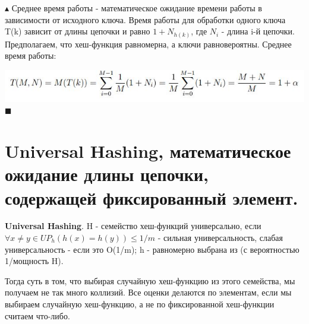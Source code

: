 $\blacktriangle$
Среднее время работы - математическое ожидание времени работы в зависимости от исходного ключа. Время работы для обработки одного ключа T(k) зависит от длины цепочки и равно $1+ N_{h(k)}$, где $N_i$ - длина i-й цепочки. Предполагаем, что хеш-функция равномерна, а ключи равновероятны.
Среднее время работы: \par
\includegraphics{images/76-83_mathwait}
$\blacksquare$

\setcounter{section}{77}
\section{Universal Hashing, математическое ожидание длины цепочки, содержащей фиксированный элемент.}
\textbf{Universal Hashing}. H - семейство хеш-функций универсально, если $\forall x \neq y \in U P_h(h(x) = h(y)) \leqslant 1/m$ - сильная универсальность, слабая универсальность - если это {O}(1/m); h - равномерно выбрана из (с вероятностью 1/мощность H). \par
Тогда суть в том, что выбирая случайную хеш-функцию из этого семейства, мы получаем не так много коллизий. Все оценки делаются по элементам, если мы выбираем случайную хеш-функцию, а не по фиксированной хеш-функции считаем что-либо. \par

\setcounter{section}{78}
